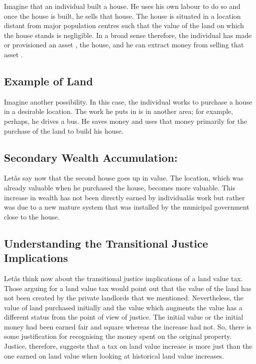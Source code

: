 \documentclass[]{tufte-handout}
\begin{document}
Imagine that an individual built a house. He uses his own labour to do
so and once the house is built, he sells that house. The house is
situated in a location distant from major population centres such that
the value of the land on which the house stands is negligible. In a
broad sense therefore, the individual has made or provisioned an asset ,
the house, and he can extract money from selling that asset .

\hypertarget{example-of-land}{%
\subsection{\texorpdfstring{\textbf{Example of
Land}}{Example of Land}}\label{example-of-land}}

Imagine another possibility. In this case, the individual works to
purchase a house in a desirable location. The work he puts in is in
another area; for example, perhaps, he drives a bus. He saves money and
uses that money primarily for the purchase of the land to build his
house.

\hypertarget{secondary-wealth-accumulation}{%
\subsection{\texorpdfstring{\textbf{Secondary Wealth
Accumulation:}}{Secondary Wealth Accumulation:}}\label{secondary-wealth-accumulation}}

Letâs say now that the second house goes up in value. The location,
which was already valuable when he purchased the house, becomes more
valuable. This increase in wealth has not been directly earned by
individualâs work but rather was due to a new mature system that was
installed by the municipal government close to the house.

\hypertarget{understanding-the-transitional-justice-implications}{%
\subsection{\texorpdfstring{\textbf{Understanding the Transitional
Justice
Implications}}{Understanding the Transitional Justice Implications}}\label{understanding-the-transitional-justice-implications}}

Letâs think now about the transitional justice implications of a land
value tax. Those arguing for a land value tax would point out that the
value of the land has not been created by the private landlords that we
mentioned. Nevertheless, the value of land purchased initially and the
value which augments the value has a different status from the point of
view of justice. The initial value or the initial money had been earned
fair and square whereas the increase had not. So, there is some
justification for recognising the money spent on the original property.
Justice, therefore, suggests that a tax on land value increase is more
just than the one earned on land value when looking at historical land
value increases.
\end{document}
